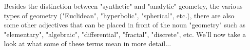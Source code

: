 \medskip
Besides the distinction between "synthetic" and "analytic" geometry, the various types of geometry ("Euclidean", "hyperbolic", "spherical", etc.), there are also some other adjectives that can be placed in front of the noun "geometry" such as "elementary", "algebraic", "differential", "fractal", "discrete", etc. We'll now take a look at what some of these terms mean in more detail...

